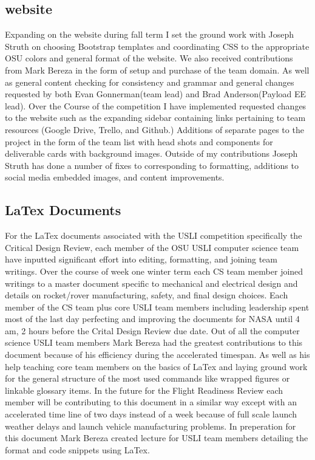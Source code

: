 \documentclass[onecolumn, draftclsnofoot,10pt, compsoc]{IEEEtran}
\begin{document}
\subsection{website}
Expanding on the website during fall term I set the ground work with Joseph Struth on choosing Bootstrap templates and coordinating CSS to the appropriate OSU colors and general format of the website. We also received contributions from Mark Bereza in the form of setup and purchase of the team domain. As well as general content checking for consistency and grammar and general changes requested by both Evan Gonnerman(team lead) and Brad Anderson(Payload EE lead). Over the Course of the competition I have implemented requested changes to the website such as the expanding sidebar containing links pertaining to team resources (Google Drive, Trello, and Github.) Additions of separate pages to the project in the form of the team list with head shots and components for deliverable cards with background images. Outside of my contributions Joseph Struth has done a number of fixes to corresponding to formatting, additions to social media embedded images, and content improvements.\par
\subsection{LaTex Documents}
For the LaTex documents associated with the USLI competition specifically the Critical Design Review, each member of the OSU USLI computer science team have inputted significant effort into editing, formatting, and joining team writings. Over the course of week one winter term each CS team member joined writings to a master document specific to mechanical and electrical design and details on rocket/rover manufacturing, safety, and final design choices. Each member of the CS team plus core USLI team members including leadership spent most of the last day perfecting and improving the documents for NASA until 4 am, 2 hours before the Crital Design Review due date. Out of all the computer science USLI team members Mark Bereza had the greatest contributions to this document because of his efficiency during the accelerated timespan. As well as his help teaching core team members on the basics of LaTex and laying ground work for the general structure of the most used commands like wrapped figures or linkable glossary items. In the future for the Flight Readiness Review each member will be contributing to this document in a similar way except with an accelerated time line of two days instead of a week because of full scale launch weather delays and launch vehicle manufacturing problems. In preperation for this document Mark Bereza created lecture for USLI team members detailing the format and code snippets using LaTex.\par
\end{document}
